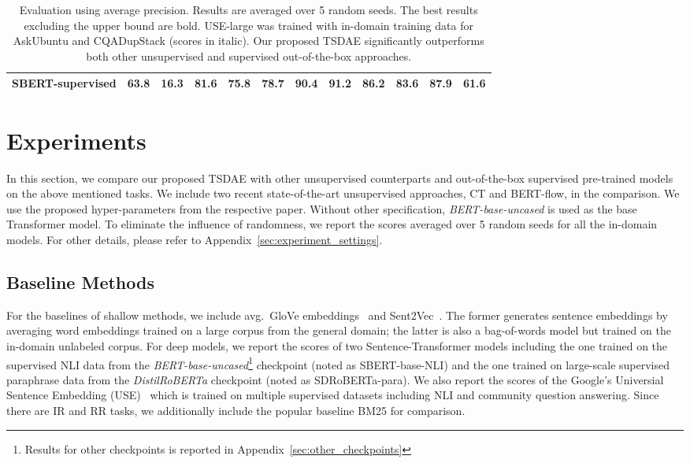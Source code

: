 \documentclass[11pt,a4paper]{article}
\begin{document}
\begin{table*}[t]
{\begin{tabular}{|l|c|c|ccc|ccccc|c|}
\hline
SBERT-supervised  & 63.8                               & 16.3                   & 81.6                   & 75.8                   & 78.7                      & 90.4           & 91.2           & 86.2                           & 83.6           & 87.9                      & 61.6                   \\
\hline
\end{tabular}}
\caption{Evaluation using average precision. Results are averaged over 5 random seeds. The best results excluding the upper bound are bold. USE-large was trained with in-domain training data for AskUbuntu and CQADupStack (scores in italic). Our proposed TSDAE significantly outperforms both other unsupervised and supervised out-of-the-box approaches.}
\label{tbl:main_results}
\end{table*}

\section{Experiments}
\label{sec:exps}
In this section, we compare our proposed TSDAE with other unsupervised counterparts and  out-of-the-box supervised pre-trained models on the above mentioned tasks. We include two recent state-of-the-art unsupervised approaches, CT and BERT-flow, in the comparison. We use the proposed hyper-parameters from the respective paper. Without other specification, \textit{BERT-base-uncased} is used as the base Transformer model. To eliminate the influence of randomness, we report the scores averaged over 5 random seeds for all the in-domain models. For other details, please refer to Appendix~\ref{sec:experiment_settings}.

\subsection{Baseline Methods}
For the baselines of shallow methods, we include avg.\ GloVe embeddings~\citep{pennington2014glove} and Sent2Vec~\citep{DBLP:conf/naacl/PagliardiniGJ18}. The former generates sentence embeddings by averaging word embeddings trained on a large corpus from the general domain; the latter is also a bag-of-words model but trained on the in-domain unlabeled corpus. For deep models, we report the scores of two Sentence-Transformer models including the one trained on the supervised NLI data from the \textit{BERT-base-uncased}\footnote{Results for other checkpoints is reported in Appendix~\ref{sec:other_checkpoints}} checkpoint (noted as SBERT-base-NLI) and the one trained on large-scale supervised paraphrase data from the \textit{DistilRoBERTa} checkpoint (noted as SDRoBERTa-para). We also report the scores of the Google's Universial Sentence Embedding (USE)~\citep{DBLP:conf/acl/YangCAGLCAYTSSK20} which is trained on multiple supervised datasets including NLI and community question answering. Since there are IR and RR tasks, we additionally include the popular baseline BM25 for comparison.
\end{document}
